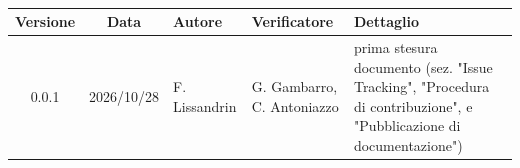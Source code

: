 
\\[0.5cm]

\renewcommand{\arraystretch}{1.3}
\noindent\begin{tabularx}{\textwidth}{|c|c|>{\raggedright\arraybackslash}p{2.8cm}|>{\raggedright\arraybackslash}p{2.8cm}|X|}
    \hline
    \textbf{Versione} & \textbf{Data} & \textbf{Autore} & \textbf{Verificatore}      & \textbf{Dettaglio}                                                                                                 \\
    \hline
    0.0.1             & 2026/10/28    & F. Lissandrin   & G. Gambarro, C. Antoniazzo & prima stesura documento (sez. "Issue Tracking", "Procedura di contribuzione", e "Pubblicazione di documentazione") \\
    \hline
\end{tabularx}
\newpage